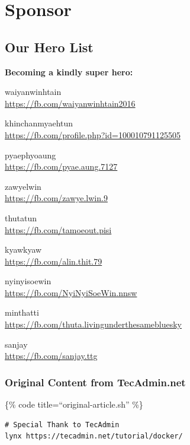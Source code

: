 \section{Sponsor}\label{sponsor}

\subsection{Our Hero List}\label{our-hero-list}

\textbf{Becoming a kindly super hero:}

waiyanwinhtain\\\href{https://fb.com/waiyanwinhtain2016}{\url{https://fb.com/waiyanwinhtain2016}}

khinchanmyaehtun\\\href{https://fb.com/profile.php?id=100010791125505}{\url{https://fb.com/profile.php?id=100010791125505}}

pyaephyoaung\\\href{https://fb.com/pyae.aung.7127}{\url{https://fb.com/pyae.aung.7127}}

zawyelwin\\\href{https://fb.com/zawye.lwin.9}{\url{https://fb.com/zawye.lwin.9}}

thutatun\\\href{https://fb.com/tamoeout.pisi}{\url{https://fb.com/tamoeout.pisi}}

kyawkyaw\\\href{https://fb.com/alin.thit.79}{\url{https://fb.com/alin.thit.79}}

nyinyisoewin\\\href{https://fb.com/NyiNyiSoeWin.nnsw}{\url{https://fb.com/NyiNyiSoeWin.nnsw}}

minthatti\\\href{https://fb.com/thuta.livingunderthesamebluesky}{\url{https://fb.com/thuta.livingunderthesamebluesky}}

sanjay\\\href{https://fb.com/sanjay.ttg}{\url{https://fb.com/sanjay.ttg}}

\subsubsection{Original Content from
TecAdmin.net}\label{original-content-from-tecadmin.net}

\{\% code title=``original-article.sh'' \%\}

\begin{verbatim}
# Special Thank to TecAdmin
lynx https://tecadmin.net/tutorial/docker/
\end{verbatim}

